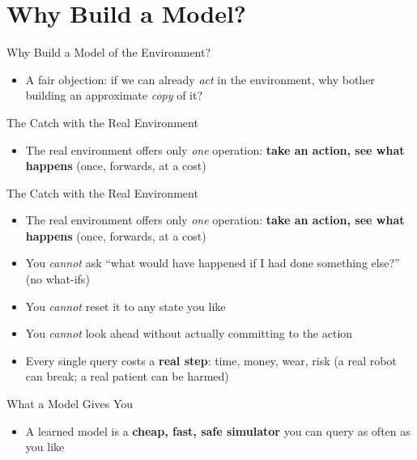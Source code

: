 \section{Why Build a Model?}

\begin{frame}{Why Build a Model of the Environment?}
\begin{itemize}
    \item A fair objection: if we can already \emph{act} in the environment, why
          bother building an approximate \emph{copy} of it?
\end{itemize}
\end{frame}

\begin{frame}{The Catch with the Real Environment}
\begin{itemize}
    \item The real environment offers only \emph{one} operation: \textbf{take an
          action, see what happens} (once, forwards, at a cost)
\end{itemize}
\end{frame}

\begin{frame}{The Catch with the Real Environment}
\begin{itemize}
    \item The real environment offers only \emph{one} operation: \textbf{take an
          action, see what happens} (once, forwards, at a cost)
    \item You \emph{cannot} ask ``what would have happened if I had done something
          else?'' (no what-ifs)
    \item You \emph{cannot} reset it to any state you like
    \item You \emph{cannot} look ahead without actually committing to the action
    \item Every single query costs a \textbf{real step}: time, money, wear,
          risk (a real robot can break; a real patient can be harmed)
\end{itemize}
\end{frame}

\begin{frame}{What a Model Gives You}
\begin{itemize}
    \item A learned model is a \textbf{cheap, fast, safe simulator} you can query
          as often as you like
\end{itemize}
\end{frame}

